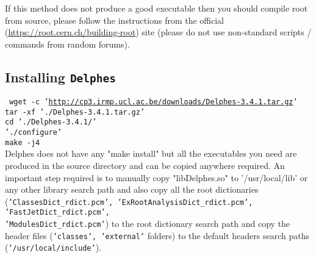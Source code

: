 If this method does not produce a good executable then you should compile root from source, please follow the instructions from the official (\url{https://root.cern.ch/building-root}) site (please do not use non-standard scripts / commands from random forums).

\subsection{Installing {\tt Delphes}}
{\tt
	wget -c '\url{http://cp3.irmp.ucl.ac.be/downloads/Delphes-3.4.1.tar.gz}'
	tar -xf './Delphes-3.4.1.tar.gz'\\
	cd './Delphes-3.4.1/'\\
	'./configure'\\
	make -j4	
}\\
Delphes does not have any "make install" but all the executables you need are produced in the source directory and can be copied anywhere required.
An important step required is to manually copy "libDelphes.so" to '/usr/local/lib' or any other library search path and also copy all the root dictionaries
({\tt 'ClassesDict\_rdict.pcm', 'ExRootAnalysisDict\_rdict.pcm', 'FastJetDict\_rdict.pcm',\\ 'ModulesDict\_rdict.pcm'}) to the root dictionary search path and copy the header files ({\tt 'classes', 'external'} folders) to the default headers search paths ({\tt '/usr/local/include'}).
